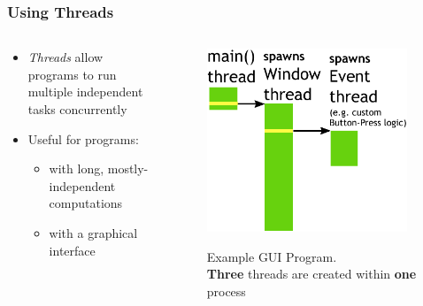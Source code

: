 \documentclass{beamer}
\newcommand{\linespace}{\vskip 0.25cm}
\begin{document}
\begin{frame}
\frametitle{Using Threads}


\begin{columns}
	\begin{column}{0.5\textwidth}
		\begin{itemize}
	
		\item \emph{Threads} allow programs to run multiple independent tasks concurrently	
		
		\linespace
		\linespace
		
		\item Useful for programs:
			\begin{itemize}
  			 \item with long, mostly-independent computations
			 \item with a graphical interface
	  		\end{itemize}
		\end{itemize}
	\end{column}
	
	\begin{column}{0.5\textwidth}
		\begin{figure}
		\includegraphics[width=0.95\textwidth]{Illustrations/ThreadExample_GUI_Part2}
		\label{fig:domains}
		\caption*{Example GUI Program. \\ \textbf{Three} threads are created within \textbf{one} process}
		\end{figure}
	\end{column}
\end{columns}

\end{frame}
\end{document}
